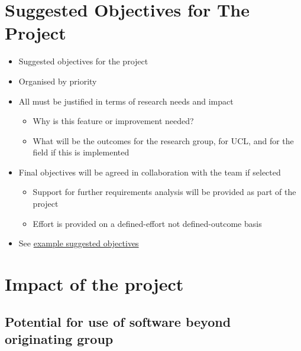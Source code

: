 \documentclass[]{scrartcl}
\begin{document}
\section{Suggested Objectives for The
Project}\label{suggested-objectives-for-the-project}

\begin{itemize}
\itemsep1pt\parskip0pt
\item
  Suggested objectives for the project
\item
  Organised by priority
\item
  All must be justified in terms of research needs and impact

  \begin{itemize}
  \itemsep1pt\parskip0pt
  \item
    Why is this feature or improvement needed?
  \item
    What will be the outcomes for the research group, for UCL, and for
    the field if this is implemented
  \end{itemize}
\item
  Final objectives will be agreed in collaboration with the team if
  selected

  \begin{itemize}
  \itemsep1pt\parskip0pt
  \item
    Support for further requirements analysis will be provided as part
    of the project
  \item
    Effort is provided on a defined-effort not defined-outcome basis
  \end{itemize}
\item
  See
  \href{http://development.rc.ucl.ac.uk/termly-call/examples.html}{example
  suggested objectives}
\end{itemize}

\section{Impact of the project}\label{impact-of-the-project}

\subsection{Potential for use of software beyond originating
group}\label{potential-for-use-of-software-beyond-originating-group}
\end{document}
